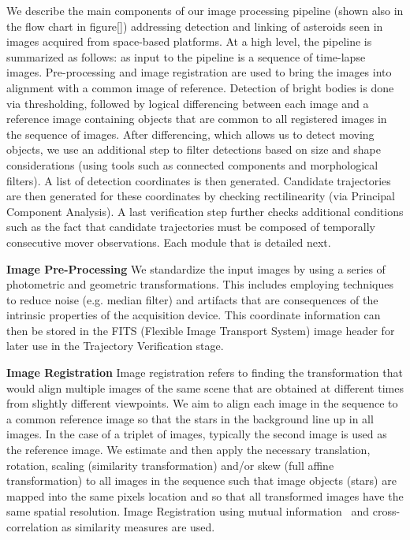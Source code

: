 \documentclass{article}
\begin{document}
We describe the main components of our image processing pipeline (shown also in the flow chart in figure\ref{}) addressing detection and linking of asteroids seen in images acquired from space-based platforms.  At a high level, the pipeline is summarized as follows: as input to the pipeline is a sequence of time-lapse images. Pre-processing and image registration are used to bring the images into alignment with a common image of reference.  Detection of bright bodies is done via thresholding, followed by logical differencing between each image and a reference image containing objects that are common to all registered images in the sequence of images.  After differencing, which allows us to detect moving objects, we use an additional step to filter detections based on size and shape considerations (using tools such as connected components and morphological filters).  A list of detection coordinates is then generated.  Candidate trajectories are then generated for these coordinates by checking rectilinearity (via Principal Component Analysis).  A last verification step further checks additional conditions such as the fact that candidate trajectories must be composed of temporally consecutive mover observations.  Each module that is detailed next. 

{\bf Image Pre-Processing}
We standardize the input images by using a series of photometric and geometric transformations.  This includes employing techniques to reduce noise (e.g. median filter) and artifacts that are consequences of the intrinsic properties of the acquisition device.   This coordinate information can then be stored in the FITS (Flexible Image Transport System) image header for later use in the Trajectory Verification stage.

{\bf Image Registration}
Image registration refers to finding the transformation that would align multiple images of the same scene that are obtained at different times from slightly different viewpoints.  We aim to align each image in the sequence to a common reference image so that the stars in the background line up in all images.  In the case of a triplet of images, typically the second image is used as the reference image.  We estimate and then apply the necessary translation, rotation, scaling (similarity transformation) and/or skew (full affine transformation) to all images in the sequence such that image objects (stars) are mapped into the same pixels location and so that all transformed images have the same spatial resolution.  Image Registration using mutual information~\cite{viola1997alignment} and cross-correlation as similarity measures are used. 
\end{document}
